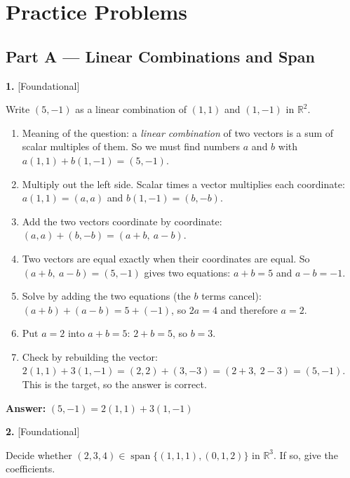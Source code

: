\documentclass[11pt]{article}
\begin{document}
\section*{\large\color{ink} Practice Problems}
\subsection*{\normalsize\color{ink} Part A --- Linear Combinations and Span}
\begin{minipage}{\linewidth}\textbf{1.} \hfill{\scriptsize\color{ink}[Foundational]}\par\nopagebreak Write $(5,-1)$ as a linear combination of $(1,1)$ and $(1,-1)$ in $\mathbb{R}^{2}$.
\end{minipage}\par\nopagebreak
\begin{tcolorbox}[breakable,colback=ans,colframe=ansb,boxrule=0.5pt,left=4pt,right=4pt,top=2pt,bottom=2pt]\begin{enumerate}[leftmargin=2.2em,itemsep=1pt,topsep=1pt,label=\textbf{Step \arabic*.}]\item Meaning of the question: a \emph{linear combination} of two vectors is a sum of scalar multiples of them. So we must find numbers $a$ and $b$ with $a(1,1)+b(1,-1)=(5,-1)$.
\item Multiply out the left side. Scalar times a vector multiplies each coordinate: $a(1,1)=(a,a)$ and $b(1,-1)=(b,-b)$.
\item Add the two vectors coordinate by coordinate: $(a,a)+(b,-b)=(a+b,\ a-b)$.
\item Two vectors are equal exactly when their coordinates are equal. So $(a+b,\ a-b)=(5,-1)$ gives two equations: $a+b=5$ \quad and \quad $a-b=-1$.
\item Solve by adding the two equations (the $b$ terms cancel): $(a+b)+(a-b)=5+(-1)$, so $2a=4$ and therefore $a=2$.
\item Put $a=2$ into $a+b=5$: $2+b=5$, so $b=3$.
\item Check by rebuilding the vector: $2(1,1)+3(1,-1)=(2,2)+(3,-3)=(2+3,\ 2-3)=(5,-1)$. This is the target, so the answer is correct.
\end{enumerate}\textbf{Answer:} $(5,-1)=2(1,1)+3(1,-1)$\end{tcolorbox}
\par\vspace{2pt}
\begin{minipage}{\linewidth}\textbf{2.} \hfill{\scriptsize\color{ink}[Foundational]}\par\nopagebreak Decide whether $(2,3,4)\in\operatorname{span}\{(1,1,1),(0,1,2)\}$ in $\mathbb{R}^{3}$. If so, give the coefficients.
\end{minipage}\par\nopagebreak
\end{document}
